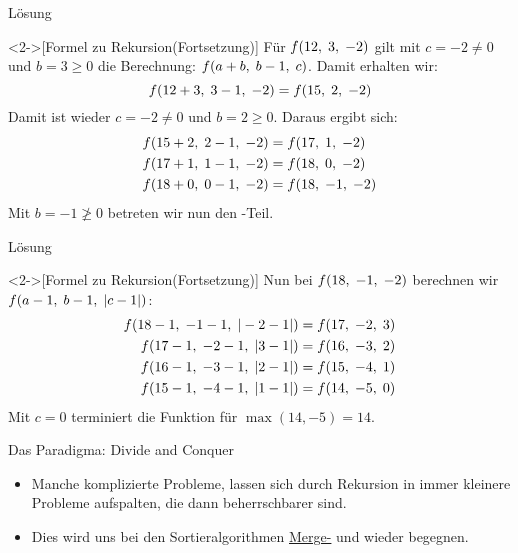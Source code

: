 \begin{frame}[c]{Lösung}
    \addtocounter{solve}{-1}%
    \begin{solve}<2->[Formel zu Rekursion\hfill(Fortsetzung)]
        \pause{}\pause{}Für \(\f(12, 3, -2)\) gilt mit \(c = -2 \neq 0\) und \(b = 3 \geq 0\) die Berechnung: \(\f(a + b, b - 1, c)\). Damit erhalten wir:\pause{}
\begin{equation*}
    \f(12 + 3, 3 - 1, -2) = \f(15, 2, -2)
\end{equation*}
        \pause{}Damit ist wieder  \(c = -2 \neq 0\) und \(b = 2 \geq 0\). Daraus ergibt sich:\pause{}
\begin{align*}
    \f(15 + 2, 2 - 1, -2) & = \f(17, 1, -2)\\
    \f(17 + 1, 1 - 1, -2) &= \f(18, 0, -2)\\
    \f(18 + 0, 0 - 1, -2) &= \f(18, -1, -2)
\end{align*}
        \pause{}Mit \(b = -1 \not\geq 0\) betreten wir nun den -Teil.
    \end{solve}
\end{frame}

\begin{frame}[c]{Lösung}
    \addtocounter{solve}{-1}%
    \begin{solve}<2->[Formel zu Rekursion\hfill(Fortsetzung)]
        \pause{}\pause{}Nun bei \(\f(18, -1, -2)\) berechnen wir \(\f(a - 1, b -1, |c - 1|)\):\pause{}
\begin{align*}
    \f(18 - 1, -1 - 1, |-2 - 1 |) &= \f(17, -2, 3) \\
    \f(17 - 1, -2 - 1, |3 - 1 |) &= \f(16, -3, 2) \\
    \f(16 - 1, -3 - 1, |2 - 1 |) &= \f(15, -4, 1) \\
    \f(15 - 1, -4 - 1, |1 - 1 |) &= \f(14, -5, 0)
\end{align*}
    \pause{}Mit \(c = 0\) terminiert die Funktion für \(\max(14, -5) = 14\).
    \end{solve}
\end{frame}
\endgroup
\fi

\begin{frame}{Das Paradigma: Divide and Conquer}
    \begin{itemize}[<+(1)->]
        \widei
        \item Manche komplizierte Probleme,\pause{} lassen sich durch Rekursion in immer kleinere Probleme aufspalten, die dann beherrschbarer sind.
        \item Dies wird uns bei den Sortieralgorithmen \hyperlink{mrk:sort-Mergesort}{Merge-} und  wieder begegnen.
    \end{itemize}
\end{frame}


